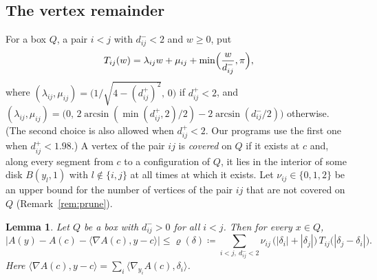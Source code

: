 \documentclass[11pt]{amsart}
\newtheorem{lemma}[theorem]{Lemma}
\theoremstyle{definition}
\theoremstyle{remark}
\numberwithin{equation}{section}
\begin{document}
\subsection{The vertex remainder}\label{sec:vertex}
For a box $Q$, a pair $i<j$ with $d^-_{ij}<2$ and $w\ge0$, put
\begin{equation}\label{eq:T}
T_{ij}(w)=\lambda_{ij}w+\mu_{ij}+\min\Bigl(\frac{w}{d^-_{ij}},\pi\Bigr),
\end{equation}
where $(\lambda_{ij},\mu_{ij})=\bigl(1/\sqrt{4-(d^+_{ij})^2},\,0\bigr)$ if $d^+_{ij}<2$, and $(\lambda_{ij},\mu_{ij})=\bigl(0,\,2\arcsin(\min(d^+_{ij},2)/2)-2\arcsin(d^-_{ij}/2)\bigr)$ otherwise. (The second choice is also allowed when $d^+_{ij}<2$. Our programs use the first one when $d^+_{ij}<1.98$.) A vertex of the pair $ij$ is \emph{covered} on $Q$ if it exists at $c$ and, along every segment from $c$ to a configuration of $Q$, it lies in the interior of some disk $B(y_l,1)$ with $l\notin\{i,j\}$ at all times at which it exists. Let $\nu_{ij}\in\{0,1,2\}$ be an upper bound for the number of vertices of the pair $ij$ that are not covered on $Q$ (Remark~\ref{rem:prune}).

\begin{lemma}\label{lem:vertex}
Let $Q$ be a box with $d^-_{ij}>0$ for all $i<j$. Then for every $x\in Q$,
\[
\bigl|A(y)-A(c)-\langle\nabla A(c),y-c\rangle\bigr|\le\varrho(\delta)\coloneqq\sum_{i<j,\ d^-_{ij}<2}\nu_{ij}\,\bigl(|\delta_i|+|\delta_j|\bigr)\,T_{ij}\bigl(|\delta_j-\delta_i|\bigr).
\]
Here $\langle\nabla A(c),y-c\rangle=\sum_i\langle\nabla_{y_i}A(c),\delta_i\rangle$.
\end{lemma}
\end{document}
